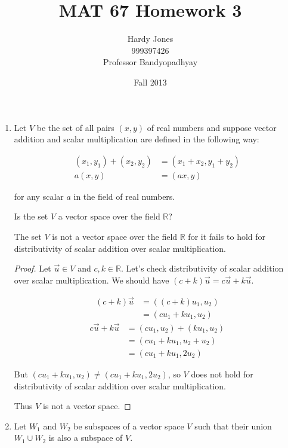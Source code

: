 \documentclass[12pt,letterpaper]{article}
\title{MAT 67 Homework 3\vspace{-2ex}}
\author{Hardy Jones\\
        999397426\\
        Professor Bandyopadhyay\vspace{-2ex}}
\date{Fall 2013}
\begin{document}
  \maketitle

  \begin{enumerate}
    \item
      Let $V$ be the set of all pairs $(x,y)$ of real numbers and suppose vector addition and scalar multiplication are defined in the following way:

      \begin{align*}
        (x_1,y_1) + (x_2,y_2) &= (x_1 + x_2, y_1 + y_2) \\
        a(x,y) &= (ax,y)
      \end{align*}

      for any scalar $a$ in the field of real numbers.

      Is the set $V$ a vector space over the field $\mathbb{R}$?

      The set $V$ is not a vector space over the field $\mathbb{R}$ for it fails to hold for distributivity of scalar addition over scalar multiplication.

      \begin{proof}

        Let $\vec{u} \in V$ and $ c, k \in \mathbb{R}$.  Let's check distributivity of scalar addition over scalar multiplication.  We should have $(c + k)\vec{u} = c\vec{u} + k\vec{u}$.

        \begin{align*}
          (c + k)\vec{u} &= ((c + k)u_1, u_2) \\
          &= (cu_1 + ku_1, u_2)
        \end{align*}
        \begin{align*}
          c\vec{u} + k\vec{u} &= (cu_1, u_2) + (ku_1, u_2) \\
          &= (cu_1 + ku_1, u_2 + u_2) \\
          &= (cu_1 + ku_1, 2u_2)
        \end{align*}

        But $(cu_1 + ku_1, u_2) \neq (cu_1 + ku_1, 2u_2)$,
        so $V$ does not hold for distributivity of scalar addition over scalar multiplication.

        Thus $V$ is not a vector space.
      \end{proof}

    \item
      Let $W_1$ and $W_2$ be subspaces of a vector space $V$ such that their union $W_1 \cup W_2$ is also a subspace of $V$.


\end{enumerate}
\end{document}
